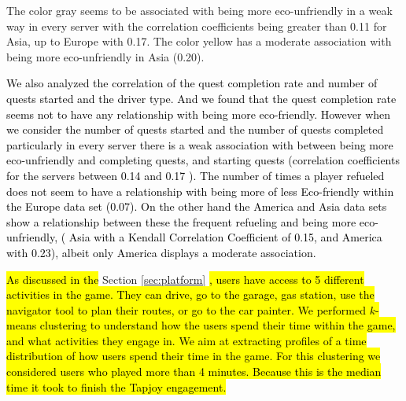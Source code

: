\documentclass[preprint,authoryear,12pt]{elsarticle}
\newcommand{\hlc}[2][yellow]{ {\sethlcolor{#1} \hl{#2}} }
\begin{document}
The color gray seems to be associated with being more eco-unfriendly in a weak way in every server with the correlation coefficients being greater than 0.11 for Asia, up to Europe with 0.17. The color yellow has a moderate association with being more eco-unfriendly in Asia (0.20).

%



\textcolor{black}{
We also analyzed the correlation of the quest completion rate and number of quests started and the driver type. And we found that the quest completion rate seems not to have any relationship with being more eco-friendly. 
However when we consider the number of quests started and the number of quests completed 
particularly in every server there is a weak association with between being more eco-unfriendly and completing quests, and starting quests (correlation coefficients for the servers between 0.14 and 0.17 ). 
}
\textcolor{black}{
The number of times a player refueled does not seem to have a relationship with being more of less Eco-friendly within the Europe data set (0.07). On the other hand the America and Asia data sets show a relationship between these the frequent refueling and being more eco-unfriendly, ( Asia with a Kendall Correlation Coefficient of 0.15, and America with 0.23), albeit only America displays a moderate association.
}





\hlc[green]{
As discussed in the }
Section \ref{sec:platform}
\hlc[green]{
, users have access to 5 different activities in the game. They can drive, go to the garage, gas station, use the navigator tool to plan their routes, or go to the car painter. 
We performed $k$-means clustering to understand how the users spend their time within the game, and what activities they engage in. We aim at extracting profiles of a time distribution of how users spend their time in the game.
For this clustering we considered users who played more than 4 minutes. Because this is the median time it took to finish the Tapjoy engagement. 
} 
\end{document}
